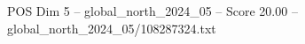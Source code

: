 \begin{textsample}{POS Dim 5 – global\_north\_2024\_05 – Score 20.00 – global\_north\_2024\_05/108287324.txt}
\end{textsample}
